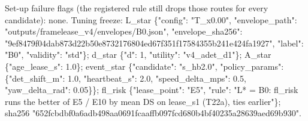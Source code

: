 \begin{table}[t]
{Set-up failure flags (the registered rule still drops those routes for every candidate): none. 
Tuning freeze: L\_star \{"config": "T\_x0.00", "envelope\_path": "outputs/framelease\_v4/envelopes/B0.json", "envelope\_sha256": "9ef8479f04dab873d22b50e8732176804ed67f351f17584355b241e424fa1927", "label": "B0", "validity": "std"\}; d\_star \{"d": 1, "utility": "v4\_adet\_d1"\}; A\_star \{"age\_lease\_s": 1.0\}; event\_star \{"candidate": "s\_hb2.0", "policy\_params": \{"det\_shift\_m": 1.0, "heartbeat\_s": 2.0, "speed\_delta\_mps": 0.5, "yaw\_delta\_rad": 0.05\}\}; fl\_risk \{"lease\_point": "E5", "rule": "L* = B0: fl\_risk runs the better of E5 / E10 by mean DS on lease\_s1 (T22a), ties earlier"\}; sha256 "652fcbdbf0a6adb498aa0691fcaaffb097fcd680b4bf40235a28639aed69b930".
}
\end{table}
